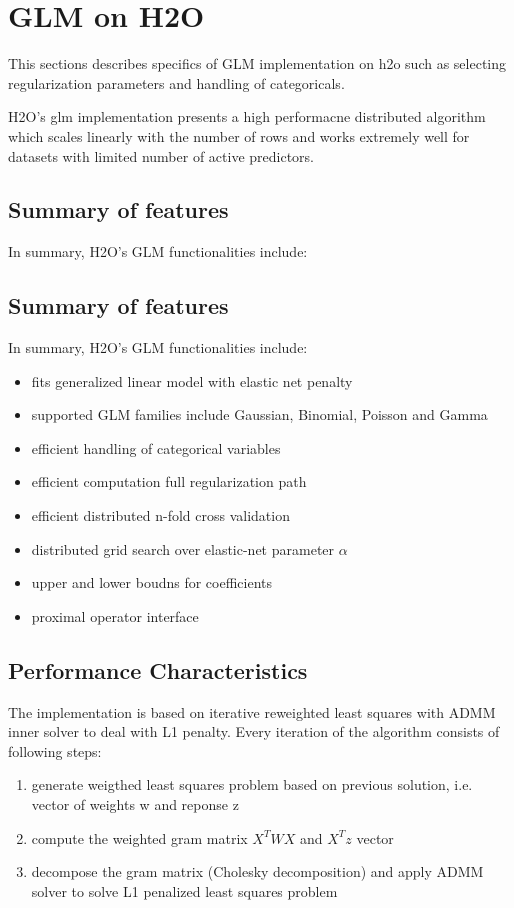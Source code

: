 \documentclass[11pt]{article}
\begin{document}


\section{GLM on H2O}
This sections describes specifics of GLM implementation on h2o such as selecting regularization parameters and handling of categoricals. 

H2O's glm implementation presents a high performacne distributed algorithm which scales linearly with the number of rows and works extremely well for datasets with limited number of active predictors. 

\subsection{Summary of features} 
In summary, H2O's GLM functionalities include:

\subsection{Summary of features} 
In summary, H2O's GLM functionalities include:


\begin{itemize} 
\item fits generalized linear model with elastic net penalty
\item supported GLM families include Gaussian, Binomial, Poisson and Gamma
\item efficient handling of categorical variables
\item efficient computation full regularization path
\item efficient distributed n-fold cross validation
\item distributed grid search over elastic-net parameter $\alpha$
\item upper and lower boudns for coefficients
\item proximal operator interface
\end{itemize}

\subsection{Performance Characteristics}
The implementation is based on iterative reweighted least squares with ADMM inner solver to deal with L1 penalty. Every iteration of the algorithm consists of following steps:
\begin{enumerate} 
\item generate weigthed least squares problem based on previous solution, i.e. vector of weights w and reponse z 
\item compute the weighted gram matrix $X^TWX$ and $X^Tz$ vector
\item decompose the gram matrix (Cholesky decomposition) and apply ADMM solver to solve L1 penalized least squares problem
\end{enumerate}
\end{document}
